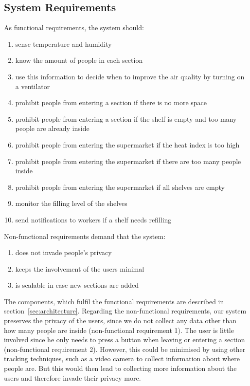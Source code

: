 \documentclass[runningheads]{llncs}
\begin{document}
	\subsection{System Requirements}
	As functional requirements, the system should: 
	\begin{enumerate}
		\item sense temperature and humidity 
		\item know the amount of people in each section
		\item use this information to decide when to improve the air quality by turning on a ventilator
		\item prohibit people from entering a section if there is no more space
		\item prohibit people from entering a section if the shelf is empty and too many people are already inside
		\item prohibit people from entering the supermarket if the heat index is too high
		\item prohibit people from entering the supermarket if there are too many people inside
		\item prohibit people from entering the supermarket if all shelves are empty 
		\item monitor the filling level of the shelves 
		\item send notifications to workers if a shelf needs refilling 
	\end{enumerate}
	Non-functional requirements demand that the system: 
	\begin{enumerate}
		\item does not invade people's privacy 
		\item keeps the involvement of the users minimal 
		\item is scalable in case new sections are added
	\end{enumerate}
	The components, which fulfil the functional requirements are described in section~\ref{sec:architecture}. 
	Regarding the non-functional requirements, our system preserves the privacy of the users, since we do not collect any data other than how many people are inside (non-functional requirement 1).
	The user is little involved since he only needs to press a button when leaving or entering a section (non-functional requirement 2).
	However, this could be minimised by using other tracking techniques, such as a video camera to collect information about where people are. 
	But this would then lead to collecting more information about the users and therefore invade their privacy more. 
\end{document}
